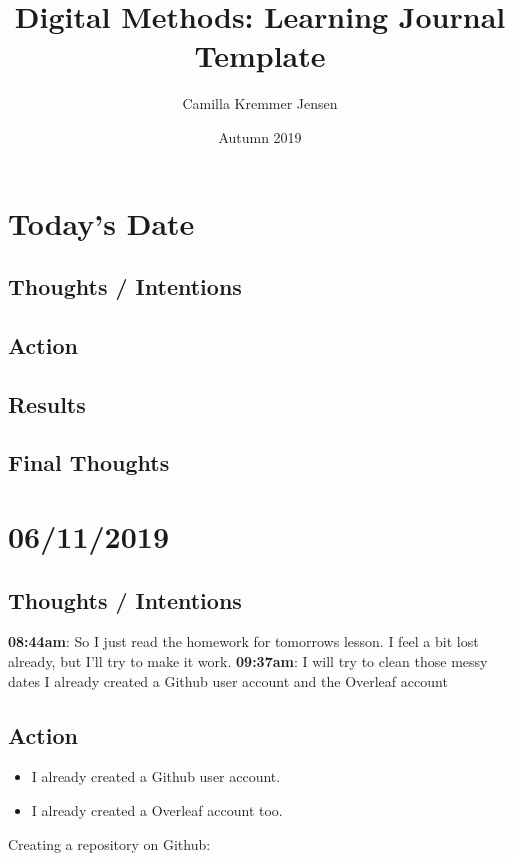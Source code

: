 \documentclass{article}
\title{Digital Methods: Learning Journal Template}
\author{Camilla Kremmer Jensen}
\date{Autumn 2019}
\begin{document}
\maketitle

\section{Today's Date}
\subsection{Thoughts / Intentions}
\subsection{Action}
\subsection{Results}
\subsection{Final Thoughts}

\pagebreak{}

\section{06/11/2019}
\subsection{Thoughts / Intentions}

\textbf{08:44am}: So I just read the homework for tomorrows lesson. I feel a bit lost already, but I'll try to make it work. 
\textbf{09:37am}: I will try to clean those messy dates 
I already created a Github user account and the Overleaf account 




\subsection{Action}

\begin{itemize}
    \item I already created a Github user account. 
    \item I already created a Overleaf account too. 
\end{itemize}

Creating a repository on Github:
\end{document}

